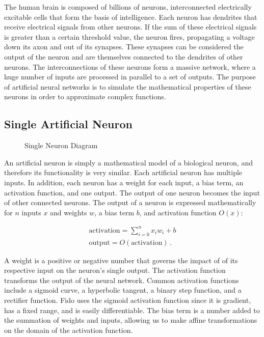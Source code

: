 The human brain is composed of billions of neurons, interconnected electrically excitable cells that form the basis of intelligence.
Each neuron has dendrites that receive electrical signals from other neurons.
If the sum of these electrical signals is greater than a certain threshold value, the neuron fires, propagating a voltage down its axon and out of its synapses.
These synapses can be considered the output of the neuron and are themselves connected to the dendrites of other neurons.
The interconnections of these neurons form a massive network, where a huge number of inputs are processed in parallel to a set of outputs.
The purpose of artificial neural networks is to simulate the mathematical properties of these neurons in order to approximate complex functions.

\subsection{Single Artificial Neuron}

\begin{figure}[ht]
	\centering
	
	\caption{Single Neuron Diagram}
\end{figure}

An artificial neuron is simply a mathematical model of a biological neuron, and therefore its functionality is very similar.
Each artificial neuron has multiple inputs.
In addition, each neuron has a weight for each input, a bias term, an activation function, and one output.
The output of one neuron becomes the input of other connected neurons.
The output of a neuron is expressed mathematically for $n$ inputs $x$ and weights $w$, a bias term $b$, and activation function $O(x)$:

\begin{align*}
	\text{activation} = \sum_{i=0}^{n}x_i w_i + b\\
	\text{output} = O(\text{activation})
	\,.
\end{align*}

A weight is a positive or negative number that governs the impact of of its respective input on the neuron's single output.
The activation function transforms the output of the neural network. Common activation functions include a sigmoid curve, a hyperbolic tangent, a binary step function, and a rectifier function. Fido uses the sigmoid activation function since it is gradient, has a fixed range, and is easily differentiable.
The bias term is a number added to the summation of weights and inputs, allowing us to make affine transformations on the domain of the activation function.

